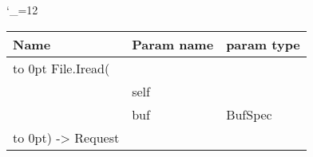 \begingroup \catcode`\_=12 \tt
\begin{tabular}{lll}
\toprule
\textrm{Name}&\textrm{Param name}&\textrm{param type}\\
\midrule
\hbox to 0pt {File.Iread(\hss}\\
& self\\
& buf & BufSpec\\
\hbox to 0pt{) -> Request\hss}\\
\bottomrule
\end{tabular}
\endgroup
